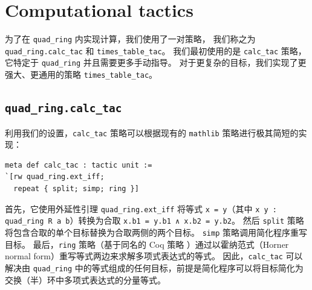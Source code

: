 \documentclass[sigplan,10pt,nonacm,
screen]{acmart} \settopmatter{printfolios=true,printccs=false,printacmref=false}
\newcommand{\mathlib}{\lstinline{mathlib}\xspace}
\begin{document}





\section{Computational tactics} \label{sec:computational-tactics}

为了在 \lstinline{quad_ring} 内实现计算，我们使用了一对策略，
我们称之为 \lstinline{quad_ring.calc_tac} 和 \lstinline{times_table_tac}。
我们最初使用的是 \lstinline{calc_tac} 策略，它特定于 \lstinline{quad_ring} 并且需要更多手动指导。
对于更复杂的目标，我们实现了更强大、更通用的策略 \lstinline{times_table_tac}。

\subsection{\lstinline{quad_ring.calc_tac}}

利用我们的设置，\lstinline{calc_tac} 策略可以根据现有的 \mathlib 策略进行极其简短的实现：
\begin{lstlisting}
meta def calc_tac : tactic unit :=
`[rw quad_ring.ext_iff;
  repeat { split; simp; ring }]
\end{lstlisting}
首先，它使用外延性引理 \lstinline{quad_ring.ext_iff} 将等式 \lstinline{x = y}（其中 \lstinline{x y : quad_ring R a b}）转换为合取 \lstinline{x.b1 = y.b1 ∧ x.b2 = y.b2}。
然后 \lstinline{split} 策略将包含合取的单个目标替换为合取两侧的两个目标。
\lstinline{simp} 策略调用简化程序重写目标。
最后，\lstinline{ring} 策略（基于同名的 Coq 策略 \cite{ring-tactic}）通过以霍纳范式（Horner normal form）重写等式两边来求解多项式表达式的等式。
因此，\lstinline{calc_tac} 可以解决由 \lstinline{quad_ring} 中的等式组成的任何目标，前提是简化程序可以将目标简化为交换（半）环中多项式表达式的分量等式。
\end{document}
